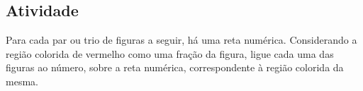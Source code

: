   \begin{center}
\end{center}
  
\subsection{Atividade}

Para cada par ou trio de figuras a seguir, há uma reta numérica. Considerando a região colorida de vermelho como uma fração da figura, ligue cada uma das figuras ao número, sobre a reta numérica, correspondente à região colorida da mesma.

